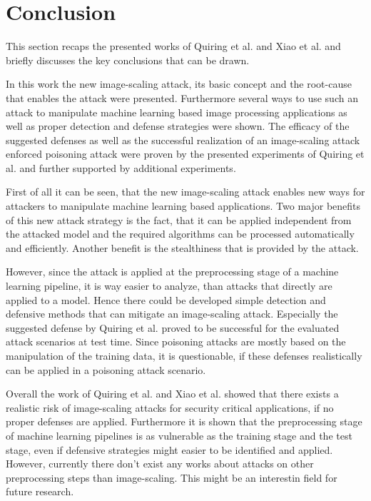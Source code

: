 \documentclass[sigconf]{acmart}
\begin{document}
\section{Conclusion}
This section recaps the presented works of Quiring et al. and Xiao et al. and briefly discusses the key conclusions that can be drawn.

In this work the new image-scaling attack, its basic concept and the root-cause that enables the attack were presented.
Furthermore several ways to use such an attack to manipulate machine learning based image processing applications as well as proper detection and defense strategies were shown.
The efficacy of the suggested defenses as well as the successful realization of an image-scaling attack enforced poisoning attack were proven by the presented experiments of Quiring et al. and further supported by additional experiments.

First of all it can be seen, that the new image-scaling attack enables new ways for attackers to manipulate machine learning based applications.
Two major benefits of this new attack strategy is the fact, that it can be applied independent from the attacked model and the required algorithms can be processed automatically and efficiently.
Another benefit is the stealthiness that is provided by the attack.

However, since the attack is applied at the preprocessing stage of a machine learning pipeline, it is way easier to analyze, than attacks that directly are applied to a model.
Hence there could be developed simple detection and defensive methods that can mitigate an image-scaling attack.
Especially the suggested defense by Quiring et al. proved to be successful for the evaluated attack scenarios at test time.
Since poisoning attacks are mostly based on the manipulation of the training data, it is questionable, if these defenses realistically can be applied in a poisoning attack scenario. 

Overall the work of Quiring et al. and Xiao et al. showed that there exists a realistic risk of image-scaling attacks for security critical applications, if no proper defenses are applied.
Furthermore it is shown that the preprocessing stage of machine learning pipelines is as vulnerable as the training stage and the test stage, even if defensive strategies might easier to be identified and applied.
However, currently there don't exist any works about attacks on other preprocessing steps than image-scaling.
This might be an interestin field for future research.



\end{document}
